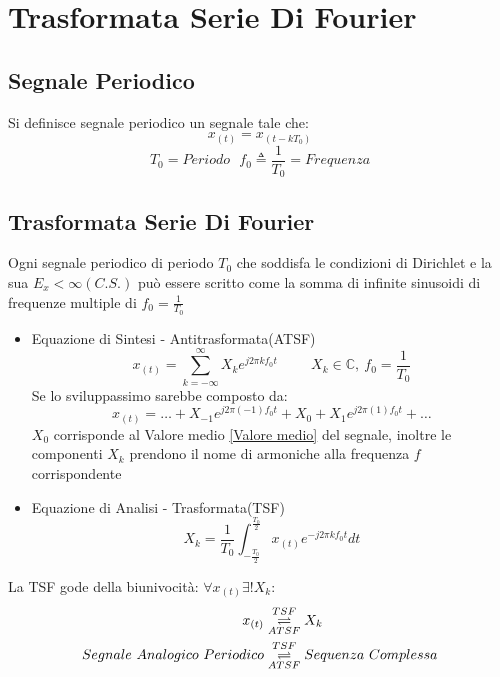 \section{Trasformata Serie Di Fourier}
    \subsection{Segnale Periodico}
        Si definisce segnale periodico un segnale tale che:
        \[
            x_{(t)} = x_{(t-kT_0)}    
        \]
        \[
            T_0=Periodo\ \ \ f_0\triangleq \frac{1}{T_0} =Frequenza
        \]
    \subsection{Trasformata Serie Di Fourier}
        Ogni segnale periodico di periodo $T_0$ che soddisfa le condizioni di Dirichlet e la sua $E_x < \infty (C.S.)$ può essere scritto come la somma di 
        infinite sinusoidi di frequenze multiple di $f_0 = \frac{1}{T_0}$
        \begin{itemize}
            \item{Equazione di Sintesi - Antitrasformata(ATSF)\label{ATSF}
                \[
                    x_{(t)} = \sum_{k = -\infty}^{\infty} X_{k} e^{j2\pi kf_0t} \hspace{1cm} X_{k}\in \mathbb{C},\ f_0 = \frac{1}{T_0} 
                \]
                Se lo sviluppassimo sarebbe composto da:
                \[
                   x_{(t)} =\ldots  + X_{-1} e^{j2\pi (-1)f_0t} + X_{0} + X_{1} e^{j2\pi (1) f_0t} + \ldots 
                \]
                $X_0$ corrisponde al Valore medio \ref{Valore medio} del segnale, inoltre le componenti $X_k$ prendono il nome di armoniche alla frequenza $f$ corrispondente
            }
            \item{Equazione di Analisi - Trasformata(TSF)\label{TSF}
                \[
                    X_k =\frac{1}{T_0}\int_{-\frac{T_0}{2}}^{\frac{T_0}{2}} x_{(t)} e^{-j2\pi kf_0t} dt
                \]
            } 
        \end{itemize}
        La TSF gode della biunivocità: $\forall x_{(t)} \exists! X_k$:
        \begin{align}
            x_{(t)} & \overunderset{TSF}{ATSF}{\rightleftharpoons} X_k  \nonumber\\
            Segnale\ Analogico\ Periodico &\overunderset{TSF}{ATSF}{\rightleftharpoons} Sequenza\ Complessa \nonumber
        \end{align}
